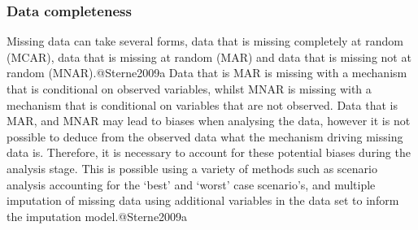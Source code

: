 \documentclass[11pt,twoside]{bristolthesis}
\begin{document}
  \hypertarget{data-completeness}{%
  \subsubsection{Data completeness}\label{data-completeness}}
  
  Missing data can take several forms, data that is missing completely at random (MCAR), data that is missing at random (MAR) and data that is missing not at random (MNAR).@Sterne2009a Data that is MAR is missing with a mechanism that is conditional on observed variables, whilst MNAR is missing with a mechanism that is conditional on variables that are not observed. Data that is MAR, and MNAR may lead to biases when analysing the data, however it is not possible to deduce from the observed data what the mechanism driving missing data is. Therefore, it is necessary to account for these potential biases during the analysis stage. This is possible using a variety of methods such as scenario analysis accounting for the `best' and `worst' case scenario's, and multiple imputation of missing data using additional variables in the data set to inform the imputation model.@Sterne2009a
  
\end{document}
